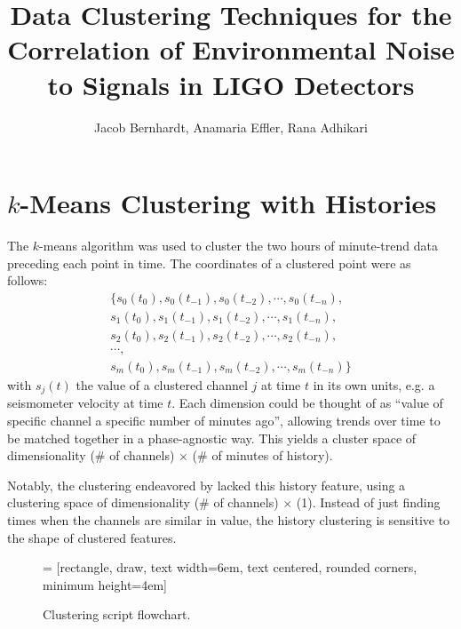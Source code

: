 \documentclass[colorlinks=true,pdfstartview=FitV,linkcolor=blue,
            citecolor=red,urlcolor=magenta]{ligodoc}
\title{Data Clustering Techniques for the Correlation of Environmental Noise to Signals in LIGO Detectors}
\author{Jacob Bernhardt, Anamaria Effler, Rana Adhikari}
\begin{document}


\section{$k$-Means Clustering with Histories}
The $k$-means algorithm was used to cluster the two hours of minute-trend data preceding each point in time.
The coordinates of a clustered point were as follows:
\begin{equation}
  \begin{array}{c}
    \{s_0(t_0),s_0(t_{-1}),s_0(t_{-2}),\cdots,s_0(t_{-n}),\\
    s_1(t_0),s_1(t_{-1}),s_1(t_{-2}),\cdots,s_1(t_{-n}),\\
    s_2(t_0),s_2(t_{-1}),s_2(t_{-2}),\cdots,s_2(t_{-n}),\\
    \cdots,\\
    s_m(t_0),s_m(t_{-1}),s_m(t_{-2}),\cdots,s_m(t_{-n})\}
  \end{array}
\end{equation}
with $s_j(t)$ the value of a clustered channel $j$ at time $t$ in its own units, e.g. a seismometer velocity at time $t$.
Each dimension could be thought of as ``value of specific channel a specific number of minutes ago'', allowing trends over time to be matched together in a phase-agnostic way.
This yields a cluster space of dimensionality (\# of channels) $\times$ (\# of minutes of history).

Notably, the clustering endeavored by \cite{roxana} lacked this history feature, using a clustering space of dimensionality (\# of channels) $\times$ (1).
Instead of just finding times when the channels are similar in value, the history clustering is sensitive to the shape of clustered features.

\begin{figure}[h]
   = [rectangle, draw, text width=6em, text centered, rounded corners, minimum height=4em]
  \caption{Clustering script flowchart.}
\end{figure}
\end{document}
